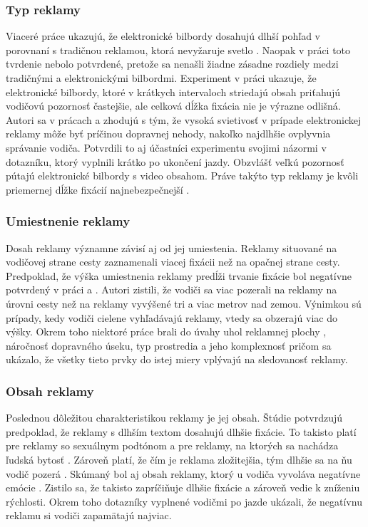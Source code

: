 \subsubsection{Typ reklamy}
Viaceré práce ukazujú, že elektronické bilbordy dosahujú dlhší pohľad v porovnaní s tradičnou reklamou, ktorá nevyžaruje svetlo \cite{OVIEDOTRESPALACIOS201985, beijer, brome}. Naopak v práci \cite{n1} toto tvrdenie nebolo potvrdené, pretože sa nenašli žiadne zásadne rozdiely medzi tradičnými a elektronickými bilbordmi. Experiment v práci \cite{brome} ukazuje, že elektronické bilbordy, ktoré v krátkych intervaloch striedajú obsah priťahujú vodičovú pozornosť častejšie, ale celková dĺžka fixácia nie je výrazne odlišná. Autori sa v prácach \cite{mollu2018driving} a \cite{beijer} zhodujú s tým, že vysoká svietivosť v prípade elektronickej reklamy môže byť príčinou dopravnej nehody, nakoľko najdlhšie ovplyvnia správanie vodiča. Potvrdili to aj účastníci experimentu svojimi názormi v dotazníku, ktorý vyplnili krátko po ukončení jazdy. Obzvlášť veľkú pozornosť pútajú elektronické bilbordy s video obsahom. Práve takýto typ reklamy je kvôli priemernej dĺžke fixácií najnebezpečnejší \cite{yellappan2016exposure, smiley2005traffic}.

\subsubsection{Umiestnenie reklamy}
Dosah reklamy významne závisí aj od jej umiestenia. Reklamy situované na vodičovej strane cesty zaznamenali viacej fixácii než na opačnej strane cesty. Predpoklad, že výška umiestnenia reklamy predĺži trvanie fixácie bol negatívne potvrdený v práci \cite{costa} a \cite{crundall}. Autori zistili, že vodiči sa viac pozerali na reklamy na úrovni cesty než na reklamy vyvýšené tri a viac metrov nad zemou. Výnimkou sú prípady, kedy vodiči cielene vyhľadávajú reklamy, vtedy sa obzerajú viac do výšky. Okrem toho niektoré práce brali do úvahy uhol reklamnej plochy \cite{zalesinska2018impact}, náročnosť dopravného úseku, typ prostredia a jeho komplexnosť \cite{costa, mollu2018driving} pričom sa ukázalo, že všetky tieto prvky do istej miery vplývajú na sledovanosť reklamy.

\subsubsection{Obsah reklamy}

Poslednou dôležitou charakteristikou reklamy je jej obsah. Štúdie \cite{harasimczuk2021longer, meuleners2020identifying} potvrdzujú predpoklad, že reklamy s dlhším textom dosahujú dlhšie fixácie. To takisto platí pre reklamy so sexuálnym podtónom \cite{MaliszewskiNorbert2019Iosa} a pre reklamy, na ktorých sa nachádza ľudská bytosť \cite{tarnowski2017roadside}. Zároveň platí, že čím je reklama zložitejšia, tým dlhšie sa na ňu vodič pozerá \cite{marciano2017effect}. Skúmaný bol aj obsah reklamy, ktorý u vodiča vyvoláva negatívne emócie \cite{chan2013emotional}. Zistilo sa, že takisto zapríčiňuje dlhšie fixácie a zároveň vedie k zníženiu rýchlosti. Okrem toho dotazníky vyplnené vodičmi po jazde ukázali, že negatívnu reklamu si vodiči zapamätajú najviac.

